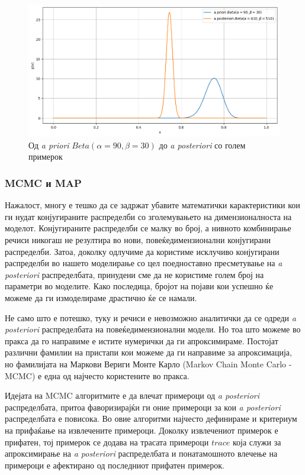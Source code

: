 \documentclass[12pt]{article}
\numberwithin{equation}{section}
\begin{document}
\begin{figure}[h]
    \centering
    \includegraphics[width=1\textwidth]{plots/beta_prior_to_posterior_large.png}
    \caption{Од \textit{a priori} \(Beta(\alpha=90, \beta=30)\) до \textit{a posteriori} со голем примерок}
    \label{fig:beta_prior_to_posterior_large}
\end{figure}

\subsubsection{MCMC и MAP}

Нажалост, многу е тешко да се задржат убавите математички карактеристики кои ги нудат конјугираните распределби со зголемувањето на димензионалноста на моделот. Конјугираните распределби се малку во број, а нивното комбинирање речиси никогаш не резултира во нови, повеќедимензионални конјугирани распределби. Затоа, доколку одлучиме да користиме исклучиво конјугирани распределби во нашето моделирање со цел поедноставно пресметување на \textit{a posteriori} распределбата, принудени сме да не користиме голем број на параметри во моделите. Како последица, бројот на појави кои успешно ќе можеме да ги измоделираме драстично ќе се намали.

Не само што е потешко, туку и речиси е невозможно аналитички да се одреди \textit{a posteriori} распределбата на повеќедимензионални модели. Но тоа што можеме во пракса да го направиме е истите нумерички да ги апроксимираме. Постојат различни фамилии на пристапи кои можеме да ги направиме за апроксимација, но фамилијата на Маркови Вериги Монте Карло (Markov Chain Monte Carlo - MCMC) е една од најчесто користените во пракса.

Идејата на MCMC алгоритмите е да влечат примероци од \textit{a posteriori} распределбата, притоа фаворизирајќи ги оние примероци за кои \textit{a posteriori} распределбата е повисока. Во овие алгоритми најчесто дефинираме и критериум на прифаќање на извлечените примероци. Доколку извлечениот примерок е прифатен, тој примерок се додава на трасата примероци \(trace\) која служи за апроксимирање на \textit{a posteriori} распределбата и понатамошното влечење на примероци е афектирано од последниот прифатен примерок.
\end{document}
